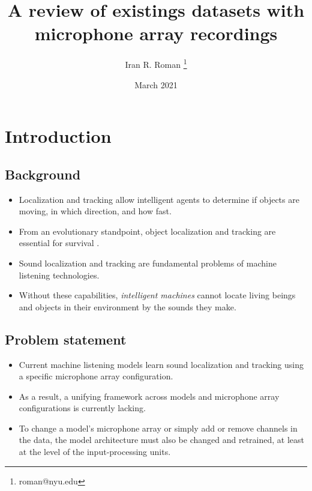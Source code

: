 \documentclass[14pt, legalpaper]{extarticle}
\title{A review of existings datasets with microphone array recordings}
\author{Iran R. Roman \thanks{roman@nyu.edu}}
\affil{Music and Audio Research Laboratory, New York University}
\date{March 2021}
\begin{document}
\maketitle
\tableofcontents

\vspace{.25in}

\section{Introduction}

\subsection{Background}

\begin{itemize}

\item Localization and tracking allow intelligent agents to determine if objects are moving, in which direction, and how fast. 

\item From an evolutionary standpoint, object localization and tracking are essential for survival \cite{heffner2018evolution}.

\item Sound localization and tracking are fundamental problems of machine listening technologies.

\item Without these capabilities, {\it intelligent machines} cannot locate living beings and objects in their environment by the sounds they make. 

\end{itemize}

\subsection{Problem statement}

\begin{itemize}

\item Current machine listening models learn sound localization and tracking using a specific microphone array configuration. 

\item As a result, a unifying framework across models and microphone array configurations is currently lacking. 

\item To change a model's microphone array or simply add or remove channels in the data, the model architecture must also be changed and retrained, at least at the level of the input-processing units.

\end{itemize}
\end{document}

